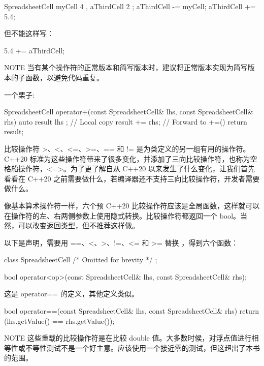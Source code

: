 \begin{cpp}
SpreadsheetCell myCell { 4 }, aThirdCell { 2 };
aThirdCell -= myCell;
aThirdCell += 5.4;
\end{cpp}

但不能这样写：

\begin{cpp}
5.4 += aThirdCell;
\end{cpp}

\begin{myNotic}{NOTE}
当有某个操作符的正常版本和简写版本时，建议将正常版本实现为简写版本的子函数，以避免代码重复。
\end{myNotic}

一个栗子:

\begin{cpp}
SpreadsheetCell operator+(const SpreadsheetCell& lhs, const SpreadsheetCell& rhs)
{
    auto result { lhs }; // Local copy
    result += rhs; // Forward to +=()
    return result;
}
\end{cpp}


比较操作符 >、<、<=、>=、== 和 != 是为类定义的另一组有用的操作符。C++20 标准为这些操作符带来了很多变化，并添加了三向比较操作符，也称为空格船操作符，<=>。为了更了解自从 C++20 以来发生了什么变化，让我们首先看看在 C++20 之前需要做什么，若编译器还不支持三向比较操作符，开发者需要做什么。


像基本算术操作符一样，六个预 C++20 比较操作符应该是全局函数，这样就可以在操作符的左、右两侧参数上使用隐式转换。比较操作符都返回一个 bool。当然，可以改变返回类型，但不推荐这样做。

以下是声明，需要用 ==、<、>、!=、<= 和 >= 替换 ，得到六个函数：

\begin{cpp}
class SpreadsheetCell { /* Omitted for brevity */ };

bool operator<op>(const SpreadsheetCell& lhs, const SpreadsheetCell& rhs);
\end{cpp}

这是 operator== 的定义，其他定义类似。

\begin{cpp}
bool operator==(const SpreadsheetCell& lhs, const SpreadsheetCell& rhs)
{
    return (lhs.getValue() == rhs.getValue());
}
\end{cpp}

\begin{myNotic}{NOTE}
这些重载的比较操作符是在比较 double 值。大多数时候，对浮点值进行相等性或不等性测试不是一个好主意。应该使用一个接近零的测试，但这超出了本书的范围。
\end{myNotic}

